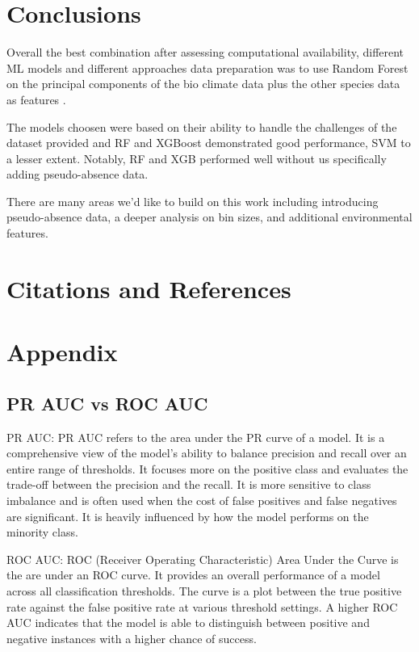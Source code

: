 \documentclass{article}
\begin{document}
\section{Conclusions}

Overall the best combination after assessing computational availability, different ML models and different approaches data preparation was  to use Random Forest on the principal components of the bio climate data plus the other species data as features .

The models choosen were based on their ability to handle the challenges of the dataset provided and RF and XGBoost demonstrated good performance, SVM to a lesser extent.  Notably, RF and XGB performed well without us specifically adding pseudo-absence data.

There are many areas we'd like to build on this work including introducing pseudo-absence data, a deeper analysis on bin sizes, and additional environmental features.  

\newpage
\section{Citations and References}



\section{Appendix}


\subsection{PR AUC vs ROC AUC}
PR AUC: PR AUC refers to the area under the PR curve of a model. It is a comprehensive view of the model's ability to balance precision and recall over an entire range of thresholds. It focuses more on the positive class and evaluates the trade-off between the precision and the recall. It is more sensitive to class imbalance and is often used when the cost of false positives and false negatives are significant. It is heavily influenced by how the model performs on the minority class.

ROC AUC:  ROC (Receiver Operating Characteristic) Area Under the Curve is the are under an ROC curve. It provides an overall performance of a model across all classification thresholds. The curve is a plot between the true positive rate against the false positive rate at various threshold settings. A higher ROC AUC indicates that the model is able to distinguish between positive and negative instances with a higher chance of success.
\end{document}
